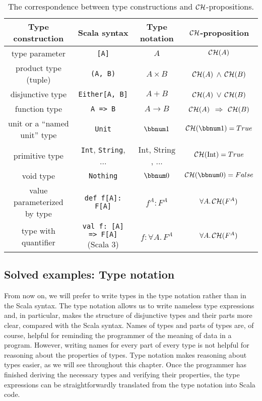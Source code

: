 \begin{table}
\begin{centering}
\begin{tabular}{|c|c|c|c|}
\hline 
\textbf{\small{}Type construction} & \textbf{\small{}Scala syntax} & \textbf{\small{}Type notation} & \textbf{\small{}${\cal CH}$-proposition}\tabularnewline
\hline 
\hline 
{\small{}type parameter} & \lstinline![A]! & $A$ & ${\cal CH}(A)$\tabularnewline
\hline 
{\small{}product type (tuple)}  & \lstinline!(A, B)! & $A\times B$ & ${\cal CH}(A)$ $\wedge$ ${\cal CH}(B)$\tabularnewline
\hline 
{\small{}disjunctive type}  & \lstinline!Either[A, B]! & $A+B$ & ${\cal CH}(A)$ $\vee$ ${\cal CH}(B)$\tabularnewline
\hline 
{\small{}function type}  & \lstinline!A => B! & $A\rightarrow B$ & ${\cal CH}(A)$ $\Rightarrow$ ${\cal CH}(B)$\tabularnewline
\hline 
{\small{}unit or a \textsf{``}named unit\textsf{''} type} & \lstinline!Unit! & $\bbnum 1$ & ${\cal CH}(\bbnum 1)=True$\tabularnewline
\hline 
{\small{}primitive type} & {\small{}}\lstinline!Int!{\small{}, }\lstinline!String!{\small{},
...} & {\small{}$\text{Int}$, $\text{String}$, ...} & ${\cal CH}(\text{Int})=True$\tabularnewline
\hline 
{\small{}void type} & \lstinline!Nothing! & $\bbnum 0$ & ${\cal CH}(\bbnum 0)=False$\tabularnewline
\hline 
{\small{}value parameterized by type} & \lstinline!def f[A]: F[A]! & $f^{A}:F^{A}$ & $\forall A.\,{\cal CH}(F^{A})$\tabularnewline
\hline 
{\small{}type with quantifier} & \lstinline!val f: [A] => F[A]!{\small{} (Scala 3)} & $f:\forall A.\,F^{A}$ & $\forall A.\,{\cal CH}(F^{A})$\tabularnewline
\hline 
\end{tabular}
\par\end{centering}
\caption{The correspondence between type constructions
and ${\cal CH}$-propositions.\label{tab:ch-correspondence-type-notation-CH-propositions}}
\end{table}


\subsection{Solved examples: Type notation}

From now on, we will prefer to write types in the type notation rather
than in the Scala syntax. The type notation allows us to write nameless
type expressions and, in particular, makes the structure of disjunctive
types and their parts more clear, compared with the Scala syntax.
Names of types and parts of types are, of course, helpful for reminding
the programmer of the meaning of data in a program. However, writing
names for every part of every type is not helpful for reasoning about
the properties of types. Type notation makes reasoning about types
easier, as we will see throughout this chapter. Once the programmer
has finished deriving the necessary types and verifying their properties,
the type expressions can be straightforwardly translated from the
type notation into Scala code.

